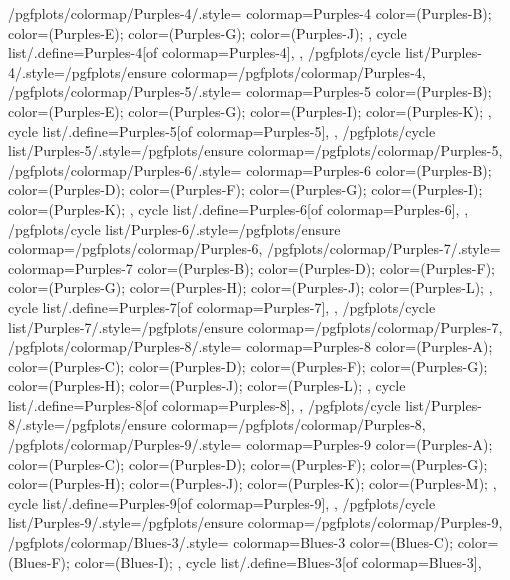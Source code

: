 {  %
  /pgfplots/colormap/Purples-4/.style={
    colormap={Purples-4}{
      color=(Purples-B);
      color=(Purples-E);
      color=(Purples-G);
      color=(Purples-J);
    },
    cycle list/.define={Purples-4}{[of colormap=Purples-4]},
  },
  /pgfplots/cycle list/Purples-4/.style={/pgfplots/ensure colormap={/pgfplots/colormap/Purples-4}},
  /pgfplots/colormap/Purples-5/.style={
    colormap={Purples-5}{
      color=(Purples-B);
      color=(Purples-E);
      color=(Purples-G);
      color=(Purples-I);
      color=(Purples-K);
    },
    cycle list/.define={Purples-5}{[of colormap=Purples-5]},
  },
  /pgfplots/cycle list/Purples-5/.style={/pgfplots/ensure colormap={/pgfplots/colormap/Purples-5}},
  /pgfplots/colormap/Purples-6/.style={
    colormap={Purples-6}{
      color=(Purples-B);
      color=(Purples-D);
      color=(Purples-F);
      color=(Purples-G);
      color=(Purples-I);
      color=(Purples-K);
    },
    cycle list/.define={Purples-6}{[of colormap=Purples-6]},
  },
  /pgfplots/cycle list/Purples-6/.style={/pgfplots/ensure colormap={/pgfplots/colormap/Purples-6}},
  /pgfplots/colormap/Purples-7/.style={
    colormap={Purples-7}{
      color=(Purples-B);
      color=(Purples-D);
      color=(Purples-F);
      color=(Purples-G);
      color=(Purples-H);
      color=(Purples-J);
      color=(Purples-L);
    },
    cycle list/.define={Purples-7}{[of colormap=Purples-7]},
  },
  /pgfplots/cycle list/Purples-7/.style={/pgfplots/ensure colormap={/pgfplots/colormap/Purples-7}},
  /pgfplots/colormap/Purples-8/.style={
    colormap={Purples-8}{
      color=(Purples-A);
      color=(Purples-C);
      color=(Purples-D);
      color=(Purples-F);
      color=(Purples-G);
      color=(Purples-H);
      color=(Purples-J);
      color=(Purples-L);
    },
    cycle list/.define={Purples-8}{[of colormap=Purples-8]},
  },
  /pgfplots/cycle list/Purples-8/.style={/pgfplots/ensure colormap={/pgfplots/colormap/Purples-8}},
  /pgfplots/colormap/Purples-9/.style={
    colormap={Purples-9}{
      color=(Purples-A);
      color=(Purples-C);
      color=(Purples-D);
      color=(Purples-F);
      color=(Purples-G);
      color=(Purples-H);
      color=(Purples-J);
      color=(Purples-K);
      color=(Purples-M);
    },
    cycle list/.define={Purples-9}{[of colormap=Purples-9]},
  },
  /pgfplots/cycle list/Purples-9/.style={/pgfplots/ensure colormap={/pgfplots/colormap/Purples-9}},
  /pgfplots/colormap/Blues-3/.style={
    colormap={Blues-3}{
      color=(Blues-C);
      color=(Blues-F);
      color=(Blues-I);
    },
    cycle list/.define={Blues-3}{[of colormap=Blues-3]},
}}

